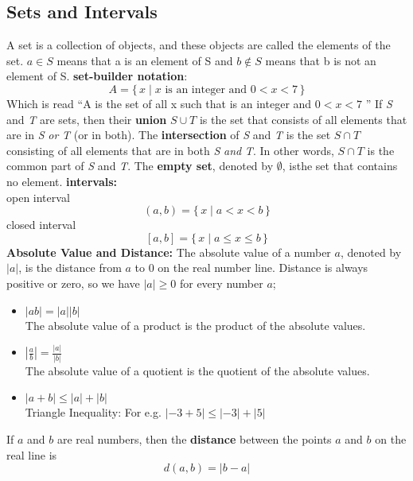 \documentclass{article}
\begin{document}
\subsection*{Sets and Intervals}
A set is a collection of objects, and these objects are called the elements of the set.
$a \in S$ means that a is an element of S and $b \not\in S$ means that b is not an element of S.
\newline
\textbf{set-builder notation}:
$$A = \{\,x \mid x \mbox{ is an integer and } 0 < x < 7 \,\}$$
Which is read ``A is the set of all x such that is an integer and $0 < x < 7$ ''
\newline
If \emph{S} and \emph{T} are sets, then their \textbf{union} $S \cup T$ is the set that consists of all elements that are in \emph{S} \textit{or} \emph{T} (or in both). The \textbf{intersection} of \emph{S} and \emph{T} is the set $S \cap T$ consisting of all elements that are in both \emph{S} \textit{and} \emph{T}. In other words, $S \cap T$ is the common part of \emph{S} and \emph{T}. The \textbf{empty set}, denoted by $\emptyset$, isthe set that contains no element.
\newline
\textbf{intervals:}\\
open interval $$(a, b) = \{\, x \mid a < x < b\,\} $$
closed interval $$[a, b] = \{\, x \mid a \leq x \leq b\,\}$$
\newline
\textbf{Absolute Value and Distance:}
The absolute value of a number $a$, denoted by $|a|$, is the distance from $a$ to 0 on the real number line. Distance is always positive or zero, so we have $|a| \geq 0$ for every number $a$;
\newline

\begin{itemize}
\item $|ab| = |a||b|$\\
  The absolute value of a product is the product of the absolute values.

\item $|\frac{a}{b}| = \frac{|a|}{|b|}$\\
  The absolute value of a quotient is the quotient of the absolute values.

\item $|a + b| \leq |a| + |b|$\\
  Triangle Inequality: For e.g. $|-3 + 5| \leq |-3| + |5|$
\end{itemize}

\newline
If $a$ and $b$ are real numbers, then the \textbf{distance} between the points $a$ and $b$ on the real line is $$d(a,b) = |b-a|$$
\end{document}
